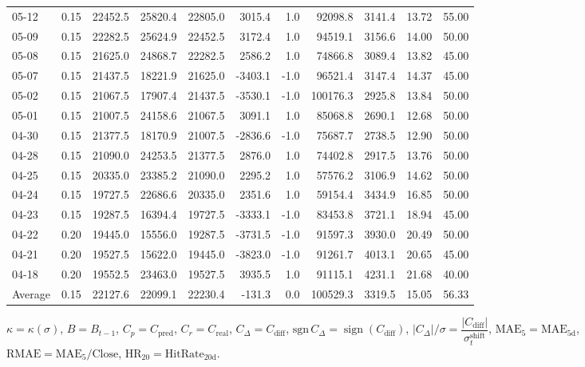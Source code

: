 \begin{threeparttable}
{\begin{tabular}{lrrrrrrrrrr}
05-12 & 0.15 & 22452.5 & 25820.4 & 22805.0 & 3015.4 & 1.0 & 92098.8 & 3141.4 & 13.72 & 55.00 \\
05-09 & 0.15 & 22282.5 & 25624.9 & 22452.5 & 3172.4 & 1.0 & 94519.1 & 3156.6 & 14.00 & 50.00 \\
05-08 & 0.15 & 21625.0 & 24868.7 & 22282.5 & 2586.2 & 1.0 & 74866.8 & 3089.4 & 13.82 & 45.00 \\
05-07 & 0.15 & 21437.5 & 18221.9 & 21625.0 & -3403.1 & -1.0 & 96521.4 & 3147.4 & 14.37 & 45.00 \\
05-02 & 0.15 & 21067.5 & 17907.4 & 21437.5 & -3530.1 & -1.0 & 100176.3 & 2925.8 & 13.84 & 50.00 \\
05-01 & 0.15 & 21007.5 & 24158.6 & 21067.5 & 3091.1 & 1.0 & 85068.8 & 2690.1 & 12.68 & 50.00 \\
04-30 & 0.15 & 21377.5 & 18170.9 & 21007.5 & -2836.6 & -1.0 & 75687.7 & 2738.5 & 12.90 & 50.00 \\
04-28 & 0.15 & 21090.0 & 24253.5 & 21377.5 & 2876.0 & 1.0 & 74402.8 & 2917.5 & 13.76 & 50.00 \\
04-25 & 0.15 & 20335.0 & 23385.2 & 21090.0 & 2295.2 & 1.0 & 57576.2 & 3106.9 & 14.62 & 50.00 \\
04-24 & 0.15 & 19727.5 & 22686.6 & 20335.0 & 2351.6 & 1.0 & 59154.4 & 3434.9 & 16.85 & 50.00 \\
04-23 & 0.15 & 19287.5 & 16394.4 & 19727.5 & -3333.1 & -1.0 & 83453.8 & 3721.1 & 18.94 & 45.00 \\
04-22 & 0.20 & 19445.0 & 15556.0 & 19287.5 & -3731.5 & -1.0 & 91597.3 & 3930.0 & 20.49 & 50.00 \\
04-21 & 0.20 & 19527.5 & 15622.0 & 19445.0 & -3823.0 & -1.0 & 91261.7 & 4013.1 & 20.65 & 45.00 \\
04-18 & 0.20 & 19552.5 & 23463.0 & 19527.5 & 3935.5 & 1.0 & 91115.1 & 4231.1 & 21.68 & 40.00 \\
Average & 0.15 & 22127.6 & 22099.1 & 22230.4 & -131.3 & 0.0 & 100529.3 & 3319.5 & 15.05 & 56.33 \\
\bottomrule
\end{tabular}
}%
\begin{tablenotes}\footnotesize
\item $\kappa=\kappa(\sigma)$, $B=B_{t-1}$, $C_p=C_{\text{pred}}$, $C_r=C_{\text{real}}$, $C_\Delta=C_{\text{diff}}$, $\mathrm{sgn}\,C_\Delta=\operatorname{sign}(C_{\text{diff}})$, $|C_\Delta|/\sigma=\dfrac{|C_{\text{diff}}|}{\sigma_t^{\text{shift}}}$, $\mathrm{MAE}_5=\mathrm{MAE}_{5\text{d}}$, $\mathrm{RMAE}= \mathrm{MAE}_5 / \text{Close}$, $\mathrm{HR}_{20}=\mathrm{HitRate}_{20\text{d}}$.
\end{tablenotes}
\end{threeparttable}
\endgroup
